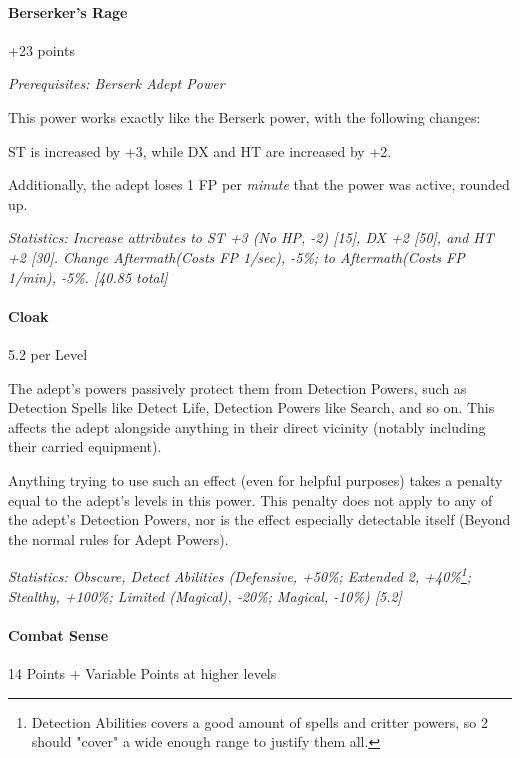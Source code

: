 \begin{multicols*}{3}
			
	\paragraph{Berserker's Rage}
	\begin{flushright}
		+23 points
	\end{flushright}
	\begin{flushright}
	\textit{Prerequisites: Berserk Adept Power}
	\end{flushright}
	
	This power works exactly like the Berserk power, with the following changes:
	
	ST is increased by +3, while DX and HT are increased by +2.
	
	Additionally, the adept loses 1 FP per \textit{minute} that the power was active, rounded up.
	
	\textcolor{OliveGreen}{\textit{Statistics: Increase attributes to ST +3 (No HP, -2) [15], DX +2 [50], and HT +2 [30]. Change Aftermath(Costs FP 1/sec), -5\%; to Aftermath(Costs FP 1/min), -5\%. [40.85 total] }}
	
	
	\paragraph{Cloak}
	\begin{flushright}
	 5.2 per Level
	\end{flushright}

	The adept's powers passively protect them from Detection Powers, such as Detection Spells like Detect Life, Detection Powers like Search, and so on. This affects the adept alongside anything in their direct vicinity (notably including their carried equipment).
	
	Anything trying to use such an effect (even for helpful purposes) takes a penalty equal to the adept's levels in this power. This penalty does not apply to any of the adept's Detection Powers, nor is the effect especially detectable itself (Beyond the normal rules for Adept Powers).

	\textcolor{OliveGreen}{\textit{Statistics: Obscure, Detect Abilities (Defensive, +50\%; Extended 2, +40\%\footnote{Detection Abilities covers a good amount of spells and critter powers, so 2 should "cover" a wide enough range to justify them all.}; Stealthy, +100\%; Limited (Magical), -20\%; Magical, -10\%) [5.2]}}
	
	\paragraph{Combat Sense}
	\begin{flushright}
		14 Points + Variable Points at higher levels
	\end{flushright}


\end{multicols*}
